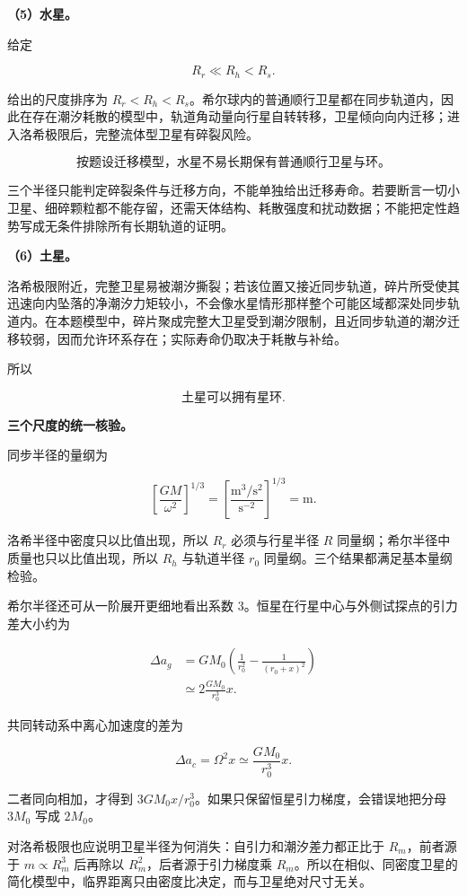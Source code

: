 \documentclass[12pt,a4paper,UTF8]{ctexart}
\begin{document}
\textbf{（5）水星。}

给定

\[R_r\ll R_h<R_s.\]

给出的尺度排序为
\(R_r<R_h<R_s\)。希尔球内的普通顺行卫星都在同步轨道内，因此在存在潮汐耗散的模型中，轨道角动量向行星自转转移，卫星倾向向内迁移；进入洛希极限后，完整流体型卫星有碎裂风险。

\[\boxed{\text{按题设迁移模型，水星不易长期保有普通顺行卫星与环。}}\]

三个半径只能判定碎裂条件与迁移方向，不能单独给出迁移寿命。若要断言一切小卫星、细碎颗粒都不能存留，还需天体结构、耗散强度和扰动数据；不能把定性趋势写成无条件排除所有长期轨道的证明。

\textbf{（6）土星。}

洛希极限附近，完整卫星易被潮汐撕裂；若该位置又接近同步轨道，碎片所受使其迅速向内坠落的净潮汐力矩较小，不会像水星情形那样整个可能区域都深处同步轨道内。在本题模型中，碎片聚成完整大卫星受到潮汐限制，且近同步轨道的潮汐迁移较弱，因而允许环系存在；实际寿命仍取决于耗散与补给。

所以

\[\boxed{\text{土星可以拥有星环}}.\]

\textbf{三个尺度的统一核验。}

同步半径的量纲为

\[\left[\frac{GM}{\omega^2}\right]^{1/3}
=\left[\frac{\mathrm{m^3/s^2}}{\mathrm{s^{-2}}}\right]^{1/3}
=\mathrm m.\]

洛希半径中密度只以比值出现，所以 \(R_r\) 必须与行星半径 \(R\)
同量纲；希尔半径中质量也只以比值出现，所以 \(R_h\) 与轨道半径 \(r_0\)
同量纲。三个结果都满足基本量纲检验。

希尔半径还可从一阶展开更细地看出系数
\(3\)。恒星在行星中心与外侧试探点的引力差大小约为

\[
\begin{aligned}
\Delta a_g
&=GM_0\left(\frac1{r_0^2}-\frac1{(r_0+x)^2}\right)\\
&\simeq2\frac{GM_0}{r_0^3}x.
\end{aligned}
\]

共同转动系中离心加速度的差为

\[\Delta a_c=\Omega^2x\simeq\frac{GM_0}{r_0^3}x.\]

二者同向相加，才得到
\(3GM_0x/r_0^3\)。如果只保留恒星引力梯度，会错误地把分母 \(3M_0\) 写成
\(2M_0\)。

对洛希极限也应说明卫星半径为何消失：自引力和潮汐差力都正比于
\(R_m\)，前者源于 \(m\propto R_m^3\) 后再除以
\(R_m^2\)，后者源于引力梯度乘
\(R_m\)。所以在相似、同密度卫星的简化模型中，临界距离只由密度比决定，而与卫星绝对尺寸无关。
\end{document}
